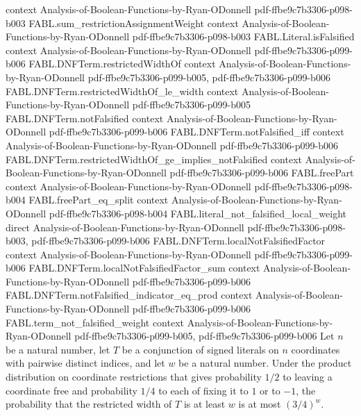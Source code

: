 \begin{theorem}
  {context}
  {Analysis-of-Boolean-Functions-by-Ryan-ODonnell}
  {pdf-ffbe9c7b3306-p098-b003}
\proofstep
  {FABL.sum_restrictionAssignmentWeight}
  {context}
  {Analysis-of-Boolean-Functions-by-Ryan-ODonnell}
  {pdf-ffbe9c7b3306-p098-b003}
\proofstep
  {FABL.Literal.isFalsified}
  {context}
  {Analysis-of-Boolean-Functions-by-Ryan-ODonnell}
  {pdf-ffbe9c7b3306-p099-b006}
\proofstep
  {FABL.DNFTerm.restrictedWidthOf}
  {context}
  {Analysis-of-Boolean-Functions-by-Ryan-ODonnell}
  {pdf-ffbe9c7b3306-p099-b005,
    pdf-ffbe9c7b3306-p099-b006}
\proofstep
  {FABL.DNFTerm.restrictedWidthOf_le_width}
  {context}
  {Analysis-of-Boolean-Functions-by-Ryan-ODonnell}
  {pdf-ffbe9c7b3306-p099-b005}
\proofstep
  {FABL.DNFTerm.notFalsified}
  {context}
  {Analysis-of-Boolean-Functions-by-Ryan-ODonnell}
  {pdf-ffbe9c7b3306-p099-b006}
\proofstep
  {FABL.DNFTerm.notFalsified_iff}
  {context}
  {Analysis-of-Boolean-Functions-by-Ryan-ODonnell}
  {pdf-ffbe9c7b3306-p099-b006}
\proofstep
  {FABL.DNFTerm.restrictedWidthOf_ge_implies_notFalsified}
  {context}
  {Analysis-of-Boolean-Functions-by-Ryan-ODonnell}
  {pdf-ffbe9c7b3306-p099-b006}
\proofstep
  {FABL.freePart}
  {context}
  {Analysis-of-Boolean-Functions-by-Ryan-ODonnell}
  {pdf-ffbe9c7b3306-p098-b004}
\proofstep
  {FABL.freePart_eq_split}
  {context}
  {Analysis-of-Boolean-Functions-by-Ryan-ODonnell}
  {pdf-ffbe9c7b3306-p098-b004}
\proofstep
  {FABL.literal_not_falsified_local_weight}
  {direct}
  {Analysis-of-Boolean-Functions-by-Ryan-ODonnell}
  {pdf-ffbe9c7b3306-p098-b003,
    pdf-ffbe9c7b3306-p099-b006}
\proofstep
  {FABL.DNFTerm.localNotFalsifiedFactor}
  {context}
  {Analysis-of-Boolean-Functions-by-Ryan-ODonnell}
  {pdf-ffbe9c7b3306-p099-b006}
\proofstep
  {FABL.DNFTerm.localNotFalsifiedFactor_sum}
  {context}
  {Analysis-of-Boolean-Functions-by-Ryan-ODonnell}
  {pdf-ffbe9c7b3306-p099-b006}
\proofstep
  {FABL.DNFTerm.notFalsified_indicator_eq_prod}
  {context}
  {Analysis-of-Boolean-Functions-by-Ryan-ODonnell}
  {pdf-ffbe9c7b3306-p099-b006}
\proofstep
  {FABL.term_not_falsified_weight}
  {context}
  {Analysis-of-Boolean-Functions-by-Ryan-ODonnell}
  {pdf-ffbe9c7b3306-p099-b005,
    pdf-ffbe9c7b3306-p099-b006}
Let $n$ be a natural number, let $T$ be a conjunction of signed literals on $n$
coordinates with pairwise distinct indices, and let $w$ be a natural number. Under the
product distribution on coordinate restrictions that gives probability $1/2$ to leaving
a coordinate free and probability $1/4$ to each of fixing it to $1$ or to $-1$, the
probability that the restricted width of $T$ is at least $w$ is at most $(3/4)^w$.
\end{theorem}

